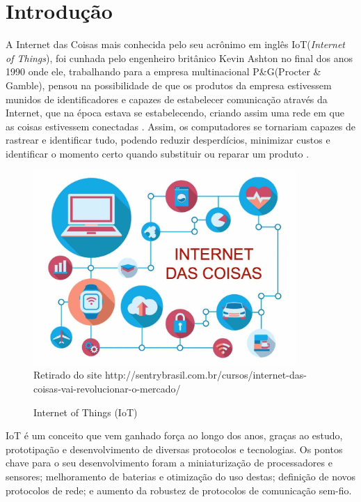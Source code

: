 \chapter[Introdução]{Introdução}
\label{cap:intro}

A Internet das Coisas mais conhecida pelo seu acrônimo em inglês IoT(\emph{Internet of Things}), foi cunhada pelo engenheiro britânico Kevin Ashton no final dos anos 1990 onde ele, trabalhando para a empresa multinacional P\&G(Procter \& Gamble), pensou na possibilidade de que os produtos da empresa estivessem munidos de identificadores e capazes de estabelecer comunicação através da Internet, que na época estava se estabelecendo, criando assim uma rede em que as coisas estivessem conectadas \cite{KA_IOT}. Assim, os computadores se tornariam capazes de rastrear e identificar tudo, podendo reduzir desperdícios, minimizar custos e identificar o momento certo quando substituir ou reparar um produto \cite{lopezIOT}.

\begin{figure}[ht]
    \centering
    \caption{Internet of Things (IoT)}
    \includegraphics[width=10cm]{./sections/textual/chapters/images/intro_iot.jpg}\\
    Retirado do site http://sentrybrasil.com.br/cursos/internet-das-coisas-vai-revolucionar-o-mercado/
    \label{fig:iotimg}
\end{figure}

IoT é um conceito que vem ganhado força ao longo dos anos, graças ao estudo, prototipação e desenvolvimento de diversas protocolos e tecnologias. Os pontos chave para o seu desenvolvimento foram a miniaturização de processadores e sensores; melhoramento de baterias e otimização do uso destas; definição de novos protocolos de rede; e aumento da robustez de protocolos de comunicação sem-fio.

